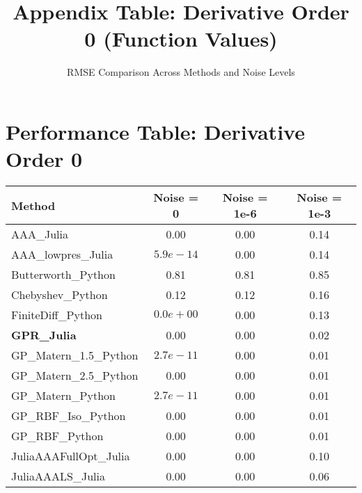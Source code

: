 \documentclass[11pt]{article}
\begin{document}
\title{Appendix Table: Derivative Order 0 (Function Values)}
\author{RMSE Comparison Across Methods and Noise Levels}
\date{}
\maketitle

\section{Performance Table: Derivative Order 0}

\begin{center}
\begin{tabular}{@{}l|ccc@{}}
\toprule
\textbf{Method} & \textbf{Noise = 0} & \textbf{Noise = 1e-6} & \textbf{Noise = 1e-3} \\
\midrule
AAA\_Julia & \textcolor{successgreen}{0.00} & \textcolor{successgreen}{0.00} & 0.14 \\
AAA\_lowpres\_Julia & \textcolor{successgreen}{$5.9e-14$} & \textcolor{successgreen}{0.00} & 0.14 \\
Butterworth\_Python & 0.81 & 0.81 & 0.85 \\
Chebyshev\_Python & 0.12 & 0.12 & 0.16 \\
FiniteDiff\_Python & \textcolor{successgreen}{$0.0e+00$} & \textcolor{successgreen}{0.00} & 0.13 \\
\textbf{GPR\_Julia} & \textcolor{successgreen}{0.00} & \textcolor{successgreen}{0.00} & \textcolor{successgreen}{0.02} \\
GP\_Matern\_1.5\_Python & \textcolor{successgreen}{$2.7e-11$} & \textcolor{successgreen}{0.00} & \textcolor{successgreen}{0.01} \\
GP\_Matern\_2.5\_Python & \textcolor{successgreen}{0.00} & \textcolor{successgreen}{0.00} & \textcolor{successgreen}{0.01} \\
GP\_Matern\_Python & \textcolor{successgreen}{$2.7e-11$} & \textcolor{successgreen}{0.00} & \textcolor{successgreen}{0.01} \\
GP\_RBF\_Iso\_Python & \textcolor{successgreen}{0.00} & \textcolor{successgreen}{0.00} & \textcolor{successgreen}{0.01} \\
GP\_RBF\_Python & \textcolor{successgreen}{0.00} & \textcolor{successgreen}{0.00} & \textcolor{successgreen}{0.01} \\
JuliaAAAFullOpt\_Julia & \textcolor{successgreen}{0.00} & \textcolor{successgreen}{0.00} & 0.10 \\
JuliaAAALS\_Julia & \textcolor{successgreen}{0.00} & \textcolor{successgreen}{0.00} & \textcolor{successgreen}{0.06} \\

\end{tabular}
\end{center}
\end{document}
